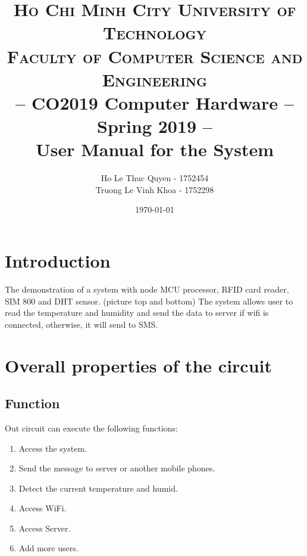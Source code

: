 \documentclass[12pt, a4paper, oneside]{article}
\title{
	\pagestyle{empty}
	\usefont{OT1}{bch}{b}{n}
	\normalfont \normalsize \textsc{Ho Chi Minh City University of Technology\\Faculty of Computer Science and Engineering}\\ [48pt]
	{\large -- CO2019 Computer Hardware -- Spring 2019 -- }
	\horrule{0.5pt} \\[0.4cm]
	\huge User Manual for the System
	\horrule{2pt} \\[0.5cm]
}
\author{
	Ho Le Thuc Quyen - 1752454\\
	Truong Le Vinh Khoa - 1752298\\
}
\date{\today}
\begin{document}
\begin{titlepage}
	\maketitle
	\thispagestyle{empty}
\end{titlepage}

\newpage
\tableofcontents

\newpage
\listoffigures
\newpage


\newpage
{}
\setcounter{page}{1}

\suppressfloats %

\section{Introduction}

The demonstration of a system with node MCU processor, RFID card reader, SIM 800 and DHT sensor. (picture top and bottom)
The system allows user to read the temperature and humidity and send the data to server if wifi is connected, otherwise, it will send to SMS.\\

\section{Overall properties of the circuit}

\subsection{Function}
Out circuit can execute the following functions:
\begin{enumerate}
	\item Access the system.
	\item Send the message to server or another mobile phones.
	\item Detect the current temperature and humid.
	\item Access WiFi.
	\item Access Server.
	\item Add more users.
\end{enumerate}
\end{document}
